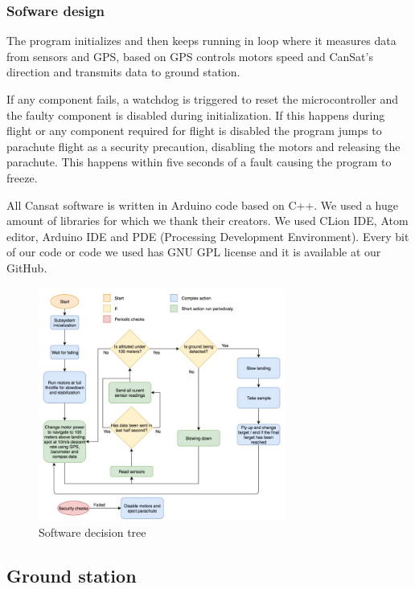 \documentclass{cfp}
\begin{document}
\subsubsection{Sofware design}
\par The program initializes and then keeps running in loop where it measures data from sensors and GPS, based on GPS controls motors speed and CanSat’s direction and transmits data to ground station.
\par If any component fails, a watchdog is triggered to reset the microcontroller and the faulty component is disabled during initialization. If this happens during flight or any component required for flight is disabled the program jumps to parachute flight as a security precaution, disabling the motors and releasing the parachute. This happens within five seconds of a fault causing the program to freeze.
\par All Cansat software is written in Arduino code based on C++. We used a huge amount of libraries for which we thank their creators. We used CLion IDE, Atom editor, Arduino IDE and PDE (Processing Development Environment). Every bit of our code or code we used has GNU GPL license and it is available at our GitHub. \cite{Git - Code}
\begin{figure}[!h]
\centering
\caption{Software decision tree}
\includegraphics[width=230pt]{decision_tree.jpg}
\end{figure}
\subsection{Ground station}
\end{document}
